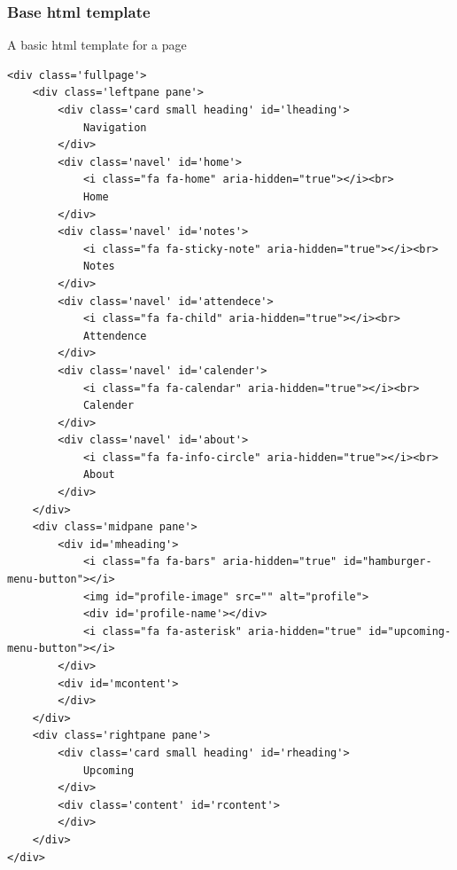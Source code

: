 \documentclass{article}
\begin{document}
\subsubsection{Base html template}
A basic html template for a page
\vspace{1em}
\begin{lstlisting}
<div class='fullpage'>
    <div class='leftpane pane'>
        <div class='card small heading' id='lheading'>
            Navigation
        </div>
        <div class='navel' id='home'>
            <i class="fa fa-home" aria-hidden="true"></i><br>
            Home
        </div>
        <div class='navel' id='notes'>
            <i class="fa fa-sticky-note" aria-hidden="true"></i><br>
            Notes
        </div>
        <div class='navel' id='attendece'>
            <i class="fa fa-child" aria-hidden="true"></i><br>
            Attendence
        </div>
        <div class='navel' id='calender'>
            <i class="fa fa-calendar" aria-hidden="true"></i><br>
            Calender
        </div>
        <div class='navel' id='about'>
            <i class="fa fa-info-circle" aria-hidden="true"></i><br>
            About
        </div>
    </div>
    <div class='midpane pane'>
        <div id='mheading'>
            <i class="fa fa-bars" aria-hidden="true" id="hamburger-menu-button"></i>
            <img id="profile-image" src="" alt="profile">
            <div id='profile-name'></div>
            <i class="fa fa-asterisk" aria-hidden="true" id="upcoming-menu-button"></i>
        </div>
        <div id='mcontent'>
        </div>
    </div>
    <div class='rightpane pane'>
        <div class='card small heading' id='rheading'>
            Upcoming
        </div>
        <div class='content' id='rcontent'>
        </div>
    </div>
</div>
\end{lstlisting}



\end{document}
